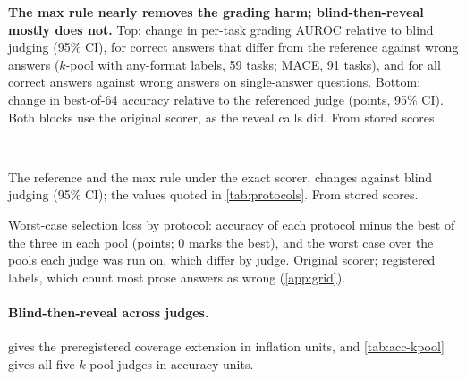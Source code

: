 \begin{table}[htbp]
\centering
\footnotesize
\caption{\textbf{The max rule nearly removes the grading harm; blind-then-reveal mostly does not.} Top: change in per-task grading AUROC relative to blind judging (95\% CI), for correct answers that differ from the reference against wrong answers ($k$-pool with any-format labels, 59 tasks; \textsc{MACE}, 91 tasks), and for all correct answers against wrong answers on single-answer questions. Bottom: change in best-of-64 accuracy relative to the referenced judge (points, 95\% CI). Both blocks use the original scorer, as the reveal calls did. From stored scores.\ph}
\label{tab:protocol-grading}
\begin{adjustbox}{max width=\linewidth}\end{adjustbox}\\[6pt]
\begin{adjustbox}{max width=\linewidth}\end{adjustbox}
\end{table}

\begin{table}[htbp]
\centering
\footnotesize
\caption{The reference and the max rule under the exact scorer, changes against blind judging (95\% CI); the values quoted in \cref{tab:protocols}. From stored scores.\ph}
\label{tab:protocol-exact}
\begin{adjustbox}{max width=\linewidth}\end{adjustbox}
\end{table}

\begin{table}[htbp]
\centering
\footnotesize
\caption{Worst-case selection loss by protocol: accuracy of each protocol minus the best of the three in each pool (points; 0 marks the best), and the worst case over the pools each judge was run on, which differ by judge. Original scorer; registered labels, which count most prose answers as wrong (\cref{app:grid}).\ph}
\label{tab:regret}
\begin{adjustbox}{max width=\linewidth}\end{adjustbox}
\end{table}

\paragraph{Blind-then-reveal across judges.}
 gives the preregistered coverage extension in inflation units, and \cref{tab:acc-kpool} gives all five $k$-pool judges in accuracy units.

